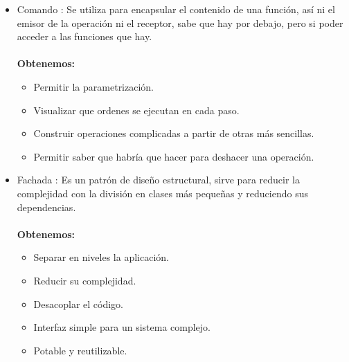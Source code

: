 \begin{itemize}
\item Comando \cite{wiki:Comando}: Se utiliza para encapsular el contenido de una función, así ni el emisor de la operación ni el receptor, sabe que hay por debajo, pero si poder acceder a las funciones que hay.\\\\
\textbf{Obtenemos:}
\begin{itemize}
\item Permitir la parametrización.
\item Visualizar que ordenes se ejecutan en cada paso.
\item Construir operaciones complicadas a partir de otras más sencillas.
\item Permitir saber que habría que hacer para deshacer una operación.
\end{itemize}
\item Fachada \cite{wiki:Fachada}: Es un patrón de diseño estructural, sirve para reducir la complejidad con la división en clases más pequeñas y reduciendo sus dependencias.\\\\
\textbf{Obtenemos:}
\begin{itemize}
\item Separar en niveles la aplicación.
\item Reducir su complejidad.
\item Desacoplar el código.
\item Interfaz simple para un sistema complejo.
\item Potable y reutilizable.
\end{itemize}
\end{itemize}
